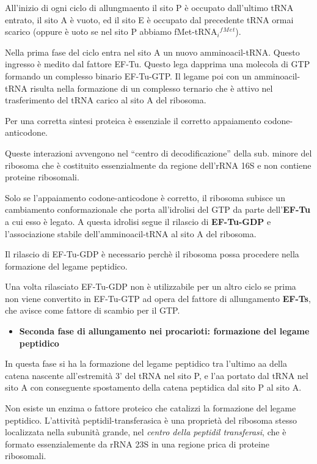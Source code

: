 \documentclass[]{article}
\begin{document}
All'inizio di ogni ciclo di allungmaento il sito P è occupato
dall'ultimo tRNA entrato, il sito A è vuoto, ed il sito E è occupato dal
precedente tRNA ormai scarico (oppure è uoto se nel sito P abbiamo
fMet-tRNA\(_i\)\(^f\)\(^M\)\(^e\)\(^t\)).

Nella prima fase del ciclo entra nel sito A un nuovo amminoacil-tRNA.
Questo ingresso è medito dal fattore EF-Tu. Questo lega dapprima una
molecola di GTP formando un complesso binario EF-Tu-GTP. Il legame poi
con un amminoacil-tRNA risulta nella formazione di un complesso ternario
che è attivo nel trasferimento del tRNA carico al sito A del ribosoma.

Per una corretta sintesi proteica è essenziale il corretto appaiamento
codone-anticodone.

Queste interazioni avvengono nel ``centro di decodificazione'' della
sub. minore del ribosoma che è costituito essenzialmente da regione
dell'rRNA 16S e non contiene proteine ribosomali.

Solo se l'appaiamento codone-anticodone è corretto, il ribosoma subisce
un cambiamento conformazionale che porta all'idrolisi del GTP da parte
dell'\textbf{EF-Tu} a cui esso è legato. A questa idrolisi segue il
rilascio di \textbf{EF-Tu-GDP} e l'associazione stabile
dell'amminoacil-tRNA al sito A del ribosoma.

Il rilascio di EF-Tu-GDP è necessario perchè il ribosoma possa procedere
nella formazione del legame peptidico.

Una volta rilasciato EF-Tu-GDP non è utilizzabile per un altro ciclo se
prima non viene convertito in EF-Tu-GTP ad opera del fattore di
allungamento \textbf{EF-Ts}, che avisce come fattore di scambio per il
GTP.

\begin{itemize}
\itemsep1pt\parskip0pt
\item
  \textbf{Seconda fase di allungamento nei procarioti: formazione del
  legame peptidico}
\end{itemize}

In questa fase si ha la formazione del legame peptidico tra l'ultimo aa
della catena nascente all'estremità 3' del tRNA nel sito P, e l'aa
portato dal tRNA nel sito A con conseguente spostamento della catena
peptidica dal sito P al sito A.

Non esiste un enzima o fattore proteico che catalizzi la formazione del
legame peptidico. L'attività peptidil-transferasica è una proprietà del
ribosoma stesso localizzata nella subunità grande, nel \emph{centro
della peptidil transferasi}, che è formato essenzialemente da rRNA 23S
in una regione prica di proteine ribosomali.
\end{document}
